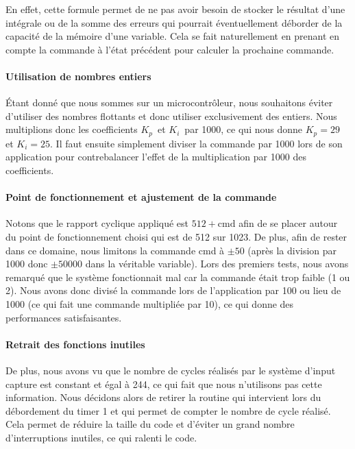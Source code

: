 \documentclass[12pt, a4paper, titlepage]{article}
\newcommand{\Kp}{\ensuremath{K_p}}
\newcommand{\Ki}{\ensuremath{K_i}}
\begin{document}
En effet, cette formule permet de ne pas avoir besoin de stocker le résultat d'une intégrale ou de la somme des erreurs qui pourrait éventuellement déborder de la capacité de la mémoire d'une variable. Cela se fait naturellement en prenant en compte la commande à l'état précédent pour calculer la prochaine commande.

\paragraph{Utilisation de nombres entiers}

Étant donné que nous sommes sur un microcontrôleur, nous souhaitons éviter d'utiliser des nombres flottants et donc utiliser exclusivement des entiers. Nous multiplions donc les coefficients \Kp\ et \Ki\ par 1000, ce qui nous donne $\Kp = 29$ et $\Ki = 25$. Il faut ensuite simplement diviser la commande par 1000 lors de son application pour contrebalancer l'effet de la multiplication par 1000 des coefficients.

\paragraph{Point de fonctionnement et ajustement de la commande}

Notons que le rapport cyclique appliqué est $512 + \text{cmd}$ afin de se placer autour du point de fonctionnement choisi qui est de 512 sur 1023. De plus, afin de rester dans ce domaine, nous limitons la commande cmd à $\pm 50$ (après la division par 1000 donc $\pm 50 000$ dans la véritable variable). Lors des premiers tests, nous avons remarqué que le système fonctionnait mal car la commande était trop faible (1 ou 2). Nous avons donc divisé la commande lors de l'application par 100 ou lieu de 1000 (ce qui fait une commande multipliée par 10), ce qui donne des performances satisfaisantes.

\paragraph{Retrait des fonctions inutiles}

De plus, nous avons vu que le nombre de cycles réalisés par le système d'input capture est constant et égal à 244, ce qui fait que nous n'utilisons pas cette information. Nous décidons alors de retirer la routine qui intervient lors du débordement du timer 1 et qui permet de compter le nombre de cycle réalisé. Cela permet de réduire la taille du code et d'éviter un grand nombre d'interruptions inutiles, ce qui ralenti le code.
\end{document}

